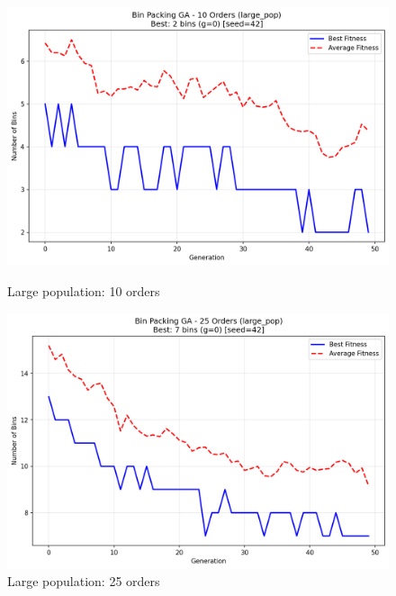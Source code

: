 \documentclass[journal,12pt,onecolumn]{IEEEtran}
\begin{document}
\begin{figure}[htbp]
\begin{minipage}{0.48\textwidth}
    \centering
    \includegraphics[width=\textwidth]{bpp_10items_large_pop_seed42.png}
    \caption{Large population: 10 orders}
    \label{fig:large_pop_10}
\end{minipage}\hfill
\begin{minipage}{0.48\textwidth}
    \centering
    \includegraphics[width=\textwidth]{bpp_25items_large_pop_seed42.png}
    \caption{Large population: 25 orders}
    \label{fig:large_pop_25}
\end{minipage}
\end{figure}
\end{document}
